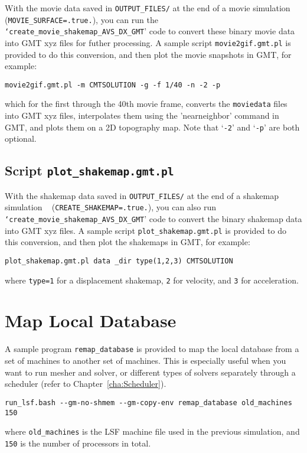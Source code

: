 With the movie data saved in \texttt{OUTPUT\_FILES/} at the end of
a movie simulation (\texttt{\small MOVIE\_SURFACE=.true.}{\small ),
you can run the }\texttt{\small `create\_movie\_shakemap\_AVS\_DX\_GMT}{\small '
code to convert these binary movie data into GMT xyz files for futher
processing. A sample script }\texttt{\small movie2gif.gmt.pl}{\small{}
is provided to do this conversion, and then plot the movie snapshots
in GMT, for example:}{\small \par}
\begin{verbatim}
movie2gif.gmt.pl -m CMTSOLUTION -g -f 1/40 -n -2 -p
\end{verbatim}
which for the first through the 40th movie frame, converts the \texttt{moviedata}
files into GMT xyz files, interpolates them using the 'nearneighbor'
command in GMT, and plots them on a 2D topography map. Note that `\texttt{-2}'
and `\texttt{-p}' are both optional.


\subsection{Script \texttt{plot\_shakemap.gmt.pl}}

With the shakemap data saved in \texttt{OUTPUT\_FILES/} at the end
of a shakemap simulation ~\newline
 (\texttt{CREATE\_SHAKEMAP=.true.}), you can also run \texttt{`create\_movie\_shakemap\_AVS\_DX\_GMT}'
code to convert the binary shakemap data into GMT xyz files. A sample
script \texttt{plot\_shakemap.gmt.pl} is provided to do this conversion,
and then plot the shakemaps in GMT, for example:
\begin{verbatim}
plot_shakemap.gmt.pl data _dir type(1,2,3) CMTSOLUTION
\end{verbatim}
where \texttt{type=1} for a displacement shakemap, \texttt{2} for
velocity, and \texttt{3} for acceleration.


\section{Map Local Database}

A sample program \texttt{remap\_database} is provided to map the local
database from a set of machines to another set of machines. This is
especially useful when you want to run mesher and solver, or different
types of solvers separately through a scheduler (refer to Chapter~\ref{cha:Scheduler}).
\begin{verbatim}
run_lsf.bash --gm-no-shmem --gm-copy-env remap_database old_machines 150
\end{verbatim}
where \texttt{old\_machines} is the LSF machine file used in the previous
simulation, and \texttt{150} is the number of processors in total.


